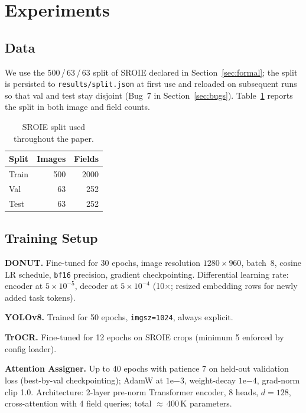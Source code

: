 \documentclass[conference]{IEEEtran}
\begin{document}
\section{Experiments}

\subsection{Data}
We use the 500\,/\,63\,/\,63 split of SROIE declared in
Section~\ref{sec:formal}; the split is persisted to
\texttt{results/split.json} at first use and reloaded on subsequent
runs so that val and test stay disjoint (Bug~7 in
Section~\ref{sec:bugs}).  Table~\ref{tab:splits} reports the split
in both image and field counts.

\begin{table}[!t]
\centering
\caption{SROIE split used throughout the paper.}
\label{tab:splits}
\begin{tabular}{lrr}
\toprule
Split & Images & Fields \\ \midrule
Train & 500 & 2000 \\
Val   &  63 &  252 \\
Test  &  63 &  252 \\ \bottomrule
\end{tabular}
\end{table}

\subsection{Training Setup}

\textbf{DONUT.}
Fine-tuned for 30 epochs, image resolution
$1280\times960$, batch~8,
cosine LR schedule, \texttt{bf16} precision,
gradient checkpointing.  Differential learning rate:
encoder at $5{\times}10^{-5}$, decoder at $5{\times}10^{-4}$
(10$\times$; resized embedding rows for newly added task tokens).

\textbf{YOLOv8.}
Trained for 50 epochs,
\texttt{imgsz=1024}, always explicit.

\textbf{TrOCR.}
Fine-tuned for 12 epochs on SROIE crops
(minimum 5 enforced by config loader).

\textbf{Attention Assigner.}
Up to 40 epochs with patience 7 on held-out
validation loss (best-by-val checkpointing); AdamW at
$1\mathrm{e}{-3}$, weight-decay $1\mathrm{e}{-4}$, grad-norm clip 1.0.
Architecture: 2-layer pre-norm Transformer encoder, 8 heads,
$d{=}128$, cross-attention with 4 field queries; total
$\approx$\,400\,K parameters.
\end{document}
